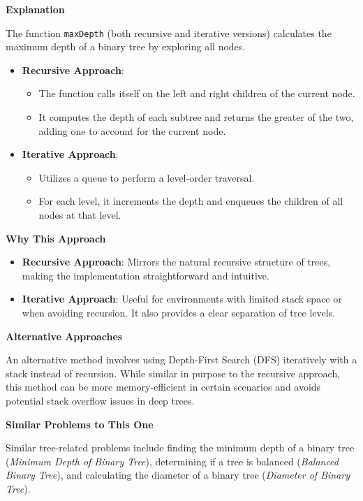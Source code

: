 \textbf{Explanation}

The function \texttt{maxDepth} (both recursive and iterative versions) calculates the maximum depth of a binary tree by exploring all nodes. 

\begin{itemize}
    \item \textbf{Recursive Approach}: 
    \begin{itemize}
        \item The function calls itself on the left and right children of the current node.
        \item It computes the depth of each subtree and returns the greater of the two, adding one to account for the current node.
    \end{itemize}
    
    \item \textbf{Iterative Approach}:
    \begin{itemize}
        \item Utilizes a queue to perform a level-order traversal.
        \item For each level, it increments the depth and enqueues the children of all nodes at that level.
    \end{itemize}
\end{itemize}

\textbf{Why This Approach}

\begin{itemize}
    \item \textbf{Recursive Approach}: Mirrors the natural recursive structure of trees, making the implementation straightforward and intuitive.
    \item \textbf{Iterative Approach}: Useful for environments with limited stack space or when avoiding recursion. It also provides a clear separation of tree levels.
\end{itemize}

\textbf{Alternative Approaches}

An alternative method involves using Depth-First Search (DFS) iteratively with a stack instead of recursion. While similar in purpose to the recursive approach, this method can be more memory-efficient in certain scenarios and avoids potential stack overflow issues in deep trees.

\textbf{Similar Problems to This One}

Similar tree-related problems include finding the minimum depth of a binary tree (\textit{Minimum Depth of Binary Tree}), determining if a tree is balanced (\textit{Balanced Binary Tree}), and calculating the diameter of a binary tree (\textit{Diameter of Binary Tree}).

